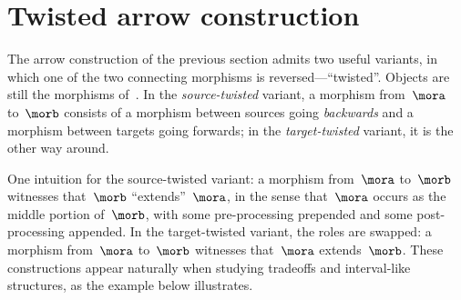 
\section{Twisted arrow construction}


The arrow construction of the previous section admits two useful variants, in which one of the two connecting morphisms is reversed---``twisted''.
Objects are still the morphisms of~\CatC.
In the \emph{source-twisted} variant, a morphism from~$\mora$ to~$\morb$ consists of a morphism between sources going \emph{backwards} and a morphism between targets going forwards; in the \emph{target-twisted} variant, it is the other way around.

One intuition for the source-twisted variant: a morphism from~$\mora$ to~$\morb$ witnesses that~$\morb$ ``extends''~$\mora$, in the sense that~$\mora$ occurs as the middle portion of~$\morb$, with some pre-processing prepended and some post-processing appended.
In the target-twisted variant, the roles are swapped: a morphism from~$\mora$ to~$\morb$ witnesses that~$\mora$ extends~$\morb$.
These constructions appear naturally when studying tradeoffs and interval-like structures, as the example below illustrates.

